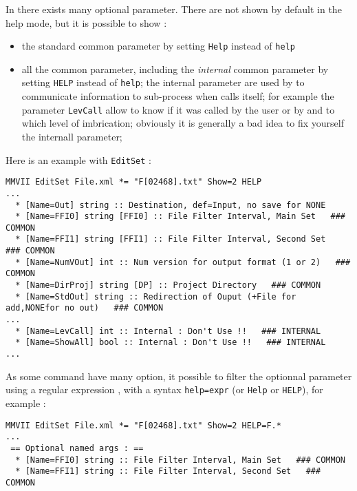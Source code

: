 In \PPP there exists many optional parameter. There are not shown by default in the help mode,
but it is possible to show :

\begin{itemize}
   \item  the standard common parameter by setting {\tt Help} instead of {\tt help}

   \item  all the common parameter, including the \emph{internal} common parameter
          by setting {\tt HELP} instead of {\tt help}; the internal parameter are used
          by \PPP to communicate information to sub-process  when  \PPP  calls itself;
          for example the parameter {\tt LevCall} allow \PPP to know if it was called
          by the user or by \PPP and to which level of imbrication; obviously it is generally
          a bad idea to fix yourself the internall parameter;
\end{itemize}

Here is an example with {\tt EditSet} :

\begin{verbatim}
MMVII EditSet File.xml *= "F[02468].txt" Show=2 HELP
...
  * [Name=Out] string :: Destination, def=Input, no save for NONE
  * [Name=FFI0] string [FFI0] :: File Filter Interval, Main Set   ### COMMON 
  * [Name=FFI1] string [FFI1] :: File Filter Interval, Second Set   ### COMMON 
  * [Name=NumVOut] int :: Num version for output format (1 or 2)   ### COMMON 
  * [Name=DirProj] string [DP] :: Project Directory   ### COMMON 
  * [Name=StdOut] string :: Redirection of Ouput (+File for add,NONEfor no out)   ### COMMON 
...
  * [Name=LevCall] int :: Internal : Don't Use !!   ### INTERNAL 
  * [Name=ShowAll] bool :: Internal : Don't Use !!   ### INTERNAL 
...
\end{verbatim}

As some command have many option, it possible to filter the
optionnal parameter using a regular expression , with a
syntax {\tt help=expr} (or {\tt Help} or {\tt HELP}), for
example :


\begin{verbatim}
MMVII EditSet File.xml *= "F[02468].txt" Show=2 HELP=F.*
...
 == Optional named args : ==
  * [Name=FFI0] string :: File Filter Interval, Main Set   ### COMMON 
  * [Name=FFI1] string :: File Filter Interval, Second Set   ### COMMON 
\end{verbatim}



